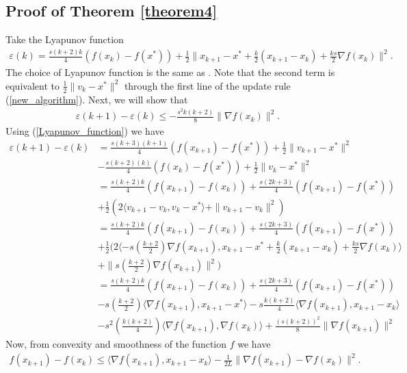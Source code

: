 \documentclass{article}
\theoremstyle{plain}
\theoremstyle{definition}
\theoremstyle{remark}
\begin{document}
\subsection{Proof of Theorem \ref{theorem4}}\label{thm5_proof}
    Take the Lyapunov function 
\begin{align}\label{Lyapunov_function}
    \varepsilon(k) = \frac{s(k+2)k}{4}(f(x_k)-f(x^*))+\frac{1}{2}\|x_{k+1}-x^*+\frac{k}{2}(x_{k+1}-x_k)+\frac{ks}{2}\nabla f(x_k)\|^2.
\end{align}
The choice of Lyapunov function is the same as \cite{Shi2021UnderstandingTA}. Note that the second term is equivalent to $\frac{1}{2}\|v_k-x^*\|^2$ through the first line of the update rule (\ref{new_algorithm}). Next, we will show that 
\begin{align}\label{Lyap_1}
    \varepsilon(k+1)-\varepsilon(k)\leq -\frac{s^2k(k+2)}{8}\|\nabla f(x_k)\|^2.
\end{align}
Using (\ref{Lyapunov_function}) we have
\begin{align}\label{Lyap_2}
    \varepsilon(k+1)-\varepsilon(k)&=\frac{s(k+3)(k+1)}{4}(f(x_{k+1})-f(x^*))+\frac{1}{2}\|v_{k+1}-x^*\|^2\nonumber\\
    & - \frac{s(k+2)(k)}{4}(f(x_{k})-f(x^*))+\frac{1}{2}\|v_{k}-x^*\|^2\nonumber\\
    &=\frac{s(k+2)k}{4}(f(x_{k+1})-f(x_k))+\frac{s(2k+3)}{4}(f(x_{k+1})-f(x^*))\nonumber\\
    &+\frac{1}{2}(2\langle v_{k+1}-v_k,v_k-x^* \rangle+\|v_{k+1}-v_k\|^2)\nonumber\\
    &= \frac{s(k+2)k}{4}(f(x_{k+1})-f(x_k))+\frac{s(2k+3)}{4}(f(x_{k+1})-f(x^*))\nonumber\\
    &+\frac{1}{2}(2\langle -s(\frac{k+2}{2})\nabla f(x_{k+1}),x_{k+1}-x^*+\frac{k}{2}(x_{k+1}-x_k)+\frac{ks}{2}\nabla f(x_k) \rangle \nonumber\\
    &+\|s(\frac{k+2}{2})\nabla f(x_{k+1})\|^2)\nonumber\\
    &= \frac{s(k+2)k}{4}(f(x_{k+1})-f(x_k))+\frac{s(2k+3)}{4}(f(x_{k+1})-f(x^*))\nonumber\\
    &-s(\frac{k+2}{2})\langle \nabla f(x_{k+1}),x_{k+1}-x^*\rangle-s\frac{k(k+2)}{4}\langle \nabla f(x_{k+1}),x_{k+1}-x_k\rangle\nonumber\\
    & -s^2(\frac{k(k+2)}{4})\langle \nabla f(x_{k+1}),\nabla f(x_k)\rangle+ \frac{(s(k+2))^2}{8}\|\nabla f(x_{k+1})\|^2
\end{align}
Now, from convexity and smoothness of the function $f$ we have
\begin{align}\label{smooth_convex}
    f(x_{k+1})-f(x_k)\leq \langle \nabla f(x_{k+1}),x_{k+1}-x_k\rangle -\frac{1}{2L}\|\nabla f(x_{k+1})-\nabla f(x_k)\|^2.
\end{align}
\end{document}
